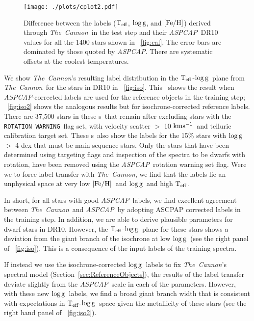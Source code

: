 \documentclass[12pt, preprint]{aastex}
\newcommand{\sectionname}{Section}
\newcommand{\figurenames}{\figurename s}
\newcommand{\tc}{\textsl{The~Cannon}}
\newcommand{\aspcap}{\textsl{ASPCAP}}
\newcommand{\rotwarn}{\texttt{ROTATION WARNING}}
\newcommand{\teff}{\mbox{$\rm T_{eff}$}}
\newcommand{\kms}{\mbox{$\rm kms^{-1}$}}
\newcommand{\feh}{\mbox{$\rm [Fe/H]$}}
\newcommand{\logg}{\mbox{$\rm \log g$}}
\begin{document}
\begin{figure}[!h]
\centering
        \texttt{[image: ./plots/cplot2.pdf]} 
\caption{Difference between the labels (\teff, \logg, and \feh) derived through \tc\ in the test step and their \aspcap\ DR10 values for all the 1400 stars shown in \figurename~\ref{fig:cal}. The error bars are dominated by those quoted by \aspcap. There are systematic offsets at the coolest temperatures.}
\label{fig:cplot}
\end{figure}


We show \tc 's resulting label distribution in the \teff-\logg\ plane from \tc\ for the stars in DR10 in \figurename~\ref{fig:iso}. 
This \figurename\ shows the result when \aspcap -corrected labels are used for the reference objects in the training step; \figurename~\ref{fig:iso2} shows the analogous results but for isochrone-corrected reference labels. There are 37,500 stars in these \figurenames\ that remain after excluding stars with the \rotwarn\ flag set, with velocity scatter $>$ 10 \kms\ and telluric calibration target set. These \figurenames\ also show the labels for the 15\% stars with \logg $>$ 4 dex that must be main sequence stars.
 Only the stars that have been determined using targeting flags and inspection of the spectra to be dwarfs with rotation, 
 have been removed using the \aspcap\ rotation warning set flag. 
 Were we to force label transfer with \tc , we find that the labels lie an unphysical space at very low \feh\ and \logg\ and high \teff.

In short, for all stars with good \aspcap\ labels, we find excellent agreement between \tc\ and \aspcap\ by adopting ASCPAP corrected labels in the training step.
In addition, we are able to derive plausible parameters for dwarf stars in DR10. However, the \teff-\logg\ plane for these stars shows a deviation from the giant branch of the isochrone at low \logg\ (see the right panel of \figurename~\ref{fig:iso}). This is a consequence of the input labels of the training spectra. 

If instead we use the isochrone-corrected \logg\ labels to fix \tc 's spectral model
(\sectionname~\ref{sec:ReferenceObjects}), the results of the label transfer deviate slightly from the \aspcap\ scale in each of the parameters. 
However, with these new \logg\ labels, we find a broad giant branch width that is consistent with expectations in \teff-\logg\ space 
given the metallicity of these stars (see the right hand panel of \figurename~\ref{fig:iso2}). 
\end{document}
